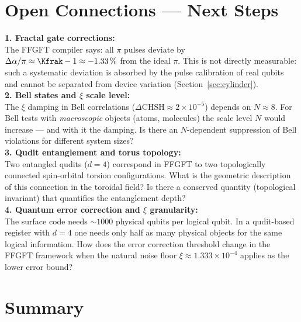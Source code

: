 \section{Open Connections --- Next Steps}
\label{sec:open-175}

\begin{significance}
\textbf{1. Fractal gate corrections:}\\
The FFGFT compiler says: all $\pi$ pulses deviate
by $\Delta\alpha/\pi \approx \Kfrak - 1 \approx -1.33\,\%$
from the ideal $\pi$.
This is not directly measurable: such a systematic
deviation is absorbed by the pulse calibration of real qubits
and cannot be separated from device variation
(Section~\ref{sec:cylinder}).\\[6pt]

\textbf{2. Bell states and $\xi$ scale level:}\\
The $\xi$ damping in Bell correlations
($\Delta\text{CHSH} \approx 2\times10^{-5}$) depends on $N \approx 8$.
For Bell tests with \emph{macroscopic} objects
(atoms, molecules) the scale level $N$ would increase ---
and with it the damping.
Is there an $N$-dependent suppression
of Bell violations for different system sizes?\\[6pt]

\textbf{3. Qudit entanglement and torus topology:}\\
Two entangled qudits ($d = 4$) correspond
in FFGFT to two topologically connected
spin-orbital torsion configurations.
What is the geometric description
of this connection in the toroidal field?
Is there a conserved quantity (topological invariant)
that quantifies the entanglement depth?\\[6pt]

\textbf{4. Quantum error correction and $\xi$ granularity:}\\
The surface code needs $\sim 1000$ physical qubits
per logical qubit.
In a qudit-based register with $d = 4$
one needs only half as many physical objects
for the same logical information.
How does the error correction threshold change
in the FFGFT framework when the natural noise floor
$\xi \approx 1.333 \times 10^{-4}$ applies as
the lower error bound?
\end{significance}

\section{Summary}
\label{sec:summary-175}

